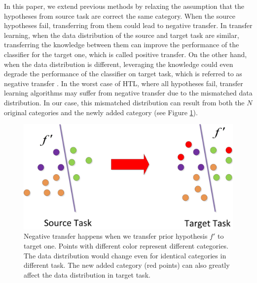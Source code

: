 In this paper, we extend previous methods by relaxing the assumption that the hypotheses from source task are correct the same category. 
When the source hypotheses fail, transferring from them could lead to negative transfer. 
In transfer learning, when the data distribution of the source and target task are similar, transferring the knowledge between them can improve the performance of the classifier for the target one, which is called positive transfer. On the other hand, when the data distribution is different, leveraging the knowledge could even degrade the performance of the classifier on target task, which is referred to as negative transfer \cite{pan2010survey}. 
In the worst case of HTL, where all hypotheses fail, transfer learning algorithms may suffer from negative transfer due to the mismatched data distribution. In our case, this mismatched distribution can result from both the $N$ original categories and the newly added category (see Figure \ref{fig:distribution}). 


\begin{figure}
\centering
\includegraphics[scale=.4]{fig/domain.jpg}
\caption{Negative transfer happens when we transfer prior hypothesis $f'$ to target one. Points with different color represent different categories. The data distribution would change even for identical categories in different task. The new added category (red points) can also greatly affect the data distribution in target task. }\label{fig:distribution}
\end{figure}

